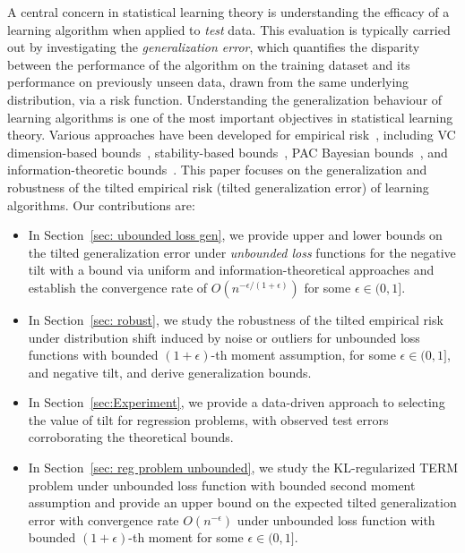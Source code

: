 \documentclass{article}
\theoremstyle{plain}
\theoremstyle{plain}
\theoremstyle{definition}
\theoremstyle{remark}
\begin{document}
A central concern in statistical learning theory is understanding the efficacy of a learning algorithm when applied to {\em test} data. This evaluation is typically carried out by investigating the {\it generalization error}, which quantifies the disparity between the performance of the algorithm on the training dataset and its performance on previously unseen data, drawn from the same underlying distribution, via a risk function. Understanding the generalization behaviour of learning algorithms is one of the most important objectives in statistical learning theory. Various approaches have been developed for empirical risk~\citep{rodrigues2021information}, including VC dimension-based bounds~\citep{vapnik1999overview}, stability-based bounds~\citep{bousquet2002stability}, PAC Bayesian bounds~\citep{mcallester2003pac}, and %
information-theoretic bounds~\citep{russo2019much,xu2017information}. This paper focuses on the generalization and robustness of the tilted empirical risk (tilted generalization error) of learning algorithms. Our contributions are:

\begin{itemize}
    \item In Section~\ref{sec: ubounded loss gen}, we provide upper and lower bounds on the tilted generalization error under {\em unbounded loss} functions for the negative tilt with a bound via uniform and information-theoretical approaches and establish the convergence rate of $O(n^{-\epsilon/(1+\epsilon)})$ for some $\epsilon\in(0,1]$.
    \item In Section~\ref{sec: robust}, we study the robustness of the tilted empirical risk under distribution shift induced by noise or outliers for unbounded loss functions with bounded $(1+\epsilon)$-th moment assumption, for some $\epsilon\in(0,1]$, and negative tilt, and derive generalization bounds.
    
    \item  In Section~\ref{sec:Experiment}, we provide a data-driven approach to selecting the value of tilt for regression problems, with observed test errors
    corroborating the theoretical bounds. %
    \item In Section~\ref{sec: reg problem unbounded}, we study the KL-regularized TERM problem under unbounded loss function with bounded second moment assumption and provide an upper bound on the expected tilted generalization error with convergence rate $O(n^{-\epsilon})$  under unbounded loss function with bounded $(1+\epsilon)$-th moment for some $\epsilon\in(0,1]$.
\end{itemize}  
\end{document}
